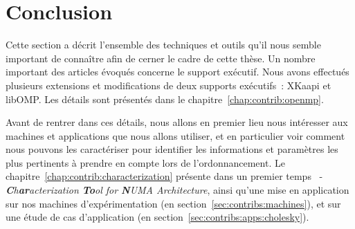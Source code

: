 



\section*{Conclusion}

Cette section a décrit l'ensemble des techniques et outils qu'il nous semble important de connaître afin de cerner le cadre de cette thèse.
Un nombre important des articles évoqués concerne le support exécutif.
Nous avons effectués plusieurs extensions et modifications de deux supports exécutifs~: XKaapi et libOMP. Les détails sont présentés dans le chapitre~\ref{chap:contrib:openmp}.

Avant de rentrer dans ces détails, nous allons en premier lieu nous intéresser aux machines et applications que nous allons utiliser, et en particulier voir comment nous pouvons les caractériser pour identifier les informations et paramètres les plus pertinents à prendre en compte lors de l'ordonnancement.
Le chapitre~\ref{chap:contrib:characterization} présente dans un premier temps \outil~- \emph{\textbf{C}h\textbf{ar}acterization \textbf{To}ol for \textbf{N}UMA Architecture}, ainsi qu'une mise en application sur nos machines d'expérimentation (en section~\ref{sec:contribs:machines}), et sur une étude de cas d'application (en section~\ref{sec:contribs:apps:cholesky}).


